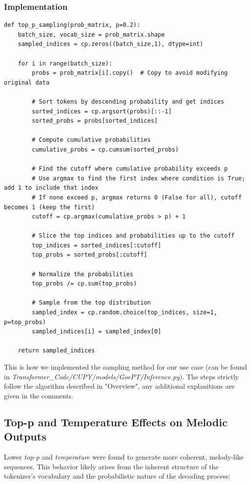 \documentclass[a4paper,12pt]{extarticle}
\begin{document}
\subsubsection{Implementation}
\begin{lstlisting}
def top_p_sampling(prob_matrix, p=0.2):
    batch_size, vocab_size = prob_matrix.shape
    sampled_indices = cp.zeros((batch_size,1), dtype=int)
    
    for i in range(batch_size):
        probs = prob_matrix[i].copy()  # Copy to avoid modifying original data
        
        # Sort tokens by descending probability and get indices
        sorted_indices = cp.argsort(probs)[::-1]
        sorted_probs = probs[sorted_indices]
        
        # Compute cumulative probabilities
        cumulative_probs = cp.cumsum(sorted_probs)
        
        # Find the cutoff where cumulative probability exceeds p
        # Use argmax to find the first index where condition is True; add 1 to include that index
        # If none exceed p, argmax returns 0 (False for all), cutoff becomes 1 (keep the first)
        cutoff = cp.argmax(cumulative_probs > p) + 1
        
        # Slice the top indices and probabilities up to the cutoff
        top_indices = sorted_indices[:cutoff]
        top_probs = sorted_probs[:cutoff]
        
        # Normalize the probabilities
        top_probs /= cp.sum(top_probs)
        
        # Sample from the top distribution
        sampled_index = cp.random.choice(top_indices, size=1, p=top_probs)
        sampled_indices[i] = sampled_index[0]
    
    return sampled_indices
\end{lstlisting}
This is how we implemented the sampling method for our use case (can be found in \textit{Transformer\_Code/CUPY/models/GoePT/Inference.py}). The steps strictly follow the algorithm described in "Overview", any additional explanitions are given in the comments. 
\subsection{Top-p and Temperature Effects on Melodic Outputs}
Lower \textit{top-p} and \textit{temperature} were found to generate more coherent, melody-like sequences. 
This behavior likely arises from the inherent structure of the tokenizer's vocabulary and the probabilistic nature of the decoding process:
\end{document}
